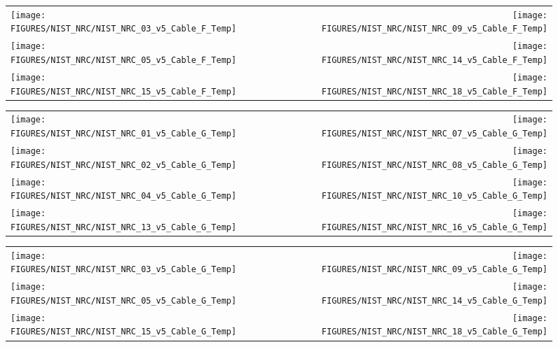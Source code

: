 \begin{figure}[p]
\begin{tabular*}{\textwidth}{l@{\extracolsep{\fill}}r}
\texttt{[image: FIGURES/NIST\_NRC/NIST\_NRC\_03\_v5\_Cable\_F\_Temp]} &
\texttt{[image: FIGURES/NIST\_NRC/NIST\_NRC\_09\_v5\_Cable\_F\_Temp]} \\
\texttt{[image: FIGURES/NIST\_NRC/NIST\_NRC\_05\_v5\_Cable\_F\_Temp]} &
\texttt{[image: FIGURES/NIST\_NRC/NIST\_NRC\_14\_v5\_Cable\_F\_Temp]} \\
\texttt{[image: FIGURES/NIST\_NRC/NIST\_NRC\_15\_v5\_Cable\_F\_Temp]} &
\texttt{[image: FIGURES/NIST\_NRC/NIST\_NRC\_18\_v5\_Cable\_F\_Temp]}
\end{tabular*}
\label{NIST_NRC_Cable_F_Open}
\end{figure}

\begin{figure}[p]
\begin{tabular*}{\textwidth}{l@{\extracolsep{\fill}}r}
\texttt{[image: FIGURES/NIST\_NRC/NIST\_NRC\_01\_v5\_Cable\_G\_Temp]} &
\texttt{[image: FIGURES/NIST\_NRC/NIST\_NRC\_07\_v5\_Cable\_G\_Temp]} \\
\texttt{[image: FIGURES/NIST\_NRC/NIST\_NRC\_02\_v5\_Cable\_G\_Temp]} &
\texttt{[image: FIGURES/NIST\_NRC/NIST\_NRC\_08\_v5\_Cable\_G\_Temp]} \\
\texttt{[image: FIGURES/NIST\_NRC/NIST\_NRC\_04\_v5\_Cable\_G\_Temp]} &
\texttt{[image: FIGURES/NIST\_NRC/NIST\_NRC\_10\_v5\_Cable\_G\_Temp]} \\
\texttt{[image: FIGURES/NIST\_NRC/NIST\_NRC\_13\_v5\_Cable\_G\_Temp]} &
\texttt{[image: FIGURES/NIST\_NRC/NIST\_NRC\_16\_v5\_Cable\_G\_Temp]}
\end{tabular*}
\label{NIST_NRC_Cable_G_Closed}
\end{figure}

\begin{figure}[p]
\begin{tabular*}{\textwidth}{l@{\extracolsep{\fill}}r}
\texttt{[image: FIGURES/NIST\_NRC/NIST\_NRC\_03\_v5\_Cable\_G\_Temp]} &
\texttt{[image: FIGURES/NIST\_NRC/NIST\_NRC\_09\_v5\_Cable\_G\_Temp]} \\
\texttt{[image: FIGURES/NIST\_NRC/NIST\_NRC\_05\_v5\_Cable\_G\_Temp]} &
\texttt{[image: FIGURES/NIST\_NRC/NIST\_NRC\_14\_v5\_Cable\_G\_Temp]} \\
\texttt{[image: FIGURES/NIST\_NRC/NIST\_NRC\_15\_v5\_Cable\_G\_Temp]} &
\texttt{[image: FIGURES/NIST\_NRC/NIST\_NRC\_18\_v5\_Cable\_G\_Temp]}
\end{tabular*}
\label{NIST_NRC_Cable_G_Open}
\end{figure}

